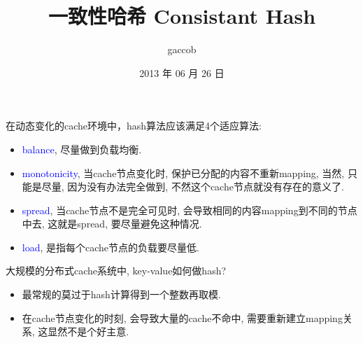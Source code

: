 

\title {\ZHH \huge 一致性哈希 Consistant Hash}
\author {\small gaccob}
\date {\small 2013 年 06 月 26 日}
\maketitle

{\ZHH 在动态变化的cache环境中，hash算法应该满足4个适应算法: }
\begin {itemize}
    \item { \textcolor{blue}{balance}, 尽量做到负载均衡. }
    \item { \textcolor{blue}{monotonicity}, 当cache节点变化时, 保护已分配的内容不重新mapping, 当然, 只能是尽量, 因为没有办法完全做到, 不然这个cache节点就没有存在的意义了. }
    \item { \textcolor{blue}{spread}, 当cache节点不是完全可见时, 会导致相同的内容mapping到不同的节点中去, 这就是spread, 要尽量避免这种情况. }
    \item { \textcolor{blue}{load}, 是指每个cache节点的负载要尽量低. }
\end {itemize}

\vspace {10pt}
{ \ZHH 大规模的分布式cache系统中, key-value如何做hash? }
\begin {itemize}
    \item { 最常规的莫过于hash计算得到一个整数再取模. }
    \item { 在cache节点变化的时刻, 会导致大量的cache不命中, 需要重新建立mapping关系, 这显然不是个好主意. }
\end {itemize}

